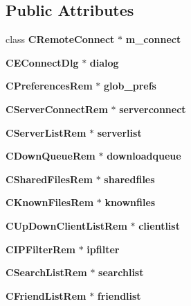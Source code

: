 \subsection*{Public Attributes}
\begin{DoxyCompactItemize}
\item 
class {\bf CRemoteConnect} $\ast$ {\bfseries m\_\-connect}\label{classCamuleRemoteGuiApp_a5e934aba2fb9c4e405799d4b0112fb7c}

\item 
{\bf CEConnectDlg} $\ast$ {\bfseries dialog}\label{classCamuleRemoteGuiApp_adb80b46828f8a10ad70b5fb9eb627beb}

\item 
{\bf CPreferencesRem} $\ast$ {\bfseries glob\_\-prefs}\label{classCamuleRemoteGuiApp_a03596f409f39e9107b6177e66f9755ca}

\item 
{\bf CServerConnectRem} $\ast$ {\bfseries serverconnect}\label{classCamuleRemoteGuiApp_a54404efab8987d111f852c136bfe0244}

\item 
{\bf CServerListRem} $\ast$ {\bfseries serverlist}\label{classCamuleRemoteGuiApp_ac0a372fcd823bea68ee9473480953c33}

\item 
{\bf CDownQueueRem} $\ast$ {\bfseries downloadqueue}\label{classCamuleRemoteGuiApp_a4647ccd5d12efe6217bf5558feabf97f}

\item 
{\bf CSharedFilesRem} $\ast$ {\bfseries sharedfiles}\label{classCamuleRemoteGuiApp_aa05fd5916ec655f97e688d56234b4ad5}

\item 
{\bf CKnownFilesRem} $\ast$ {\bfseries knownfiles}\label{classCamuleRemoteGuiApp_a17c906e037867c3705b27071c70a25f8}

\item 
{\bf CUpDownClientListRem} $\ast$ {\bfseries clientlist}\label{classCamuleRemoteGuiApp_ac643d2162eaf411fd3b985951642a325}

\item 
{\bf CIPFilterRem} $\ast$ {\bfseries ipfilter}\label{classCamuleRemoteGuiApp_a61b99f7b3d1e4f87a061537d1a592b25}

\item 
{\bf CSearchListRem} $\ast$ {\bfseries searchlist}\label{classCamuleRemoteGuiApp_ad9c84b5d4a7fa26fbad842b0c781236a}

\item 
{\bf CFriendListRem} $\ast$ {\bfseries friendlist}\label{classCamuleRemoteGuiApp_ae91d4220eb6cdfbed2f370b547d3a321}


\end{DoxyCompactItemize}
